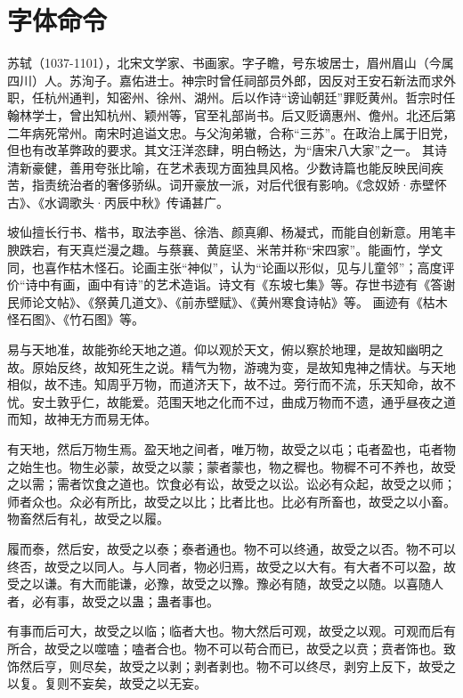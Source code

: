 \section{字体命令}
\label{sec:first}

苏轼（1037-1101），北宋文学家、书画家。字子瞻，号东坡居士，眉州眉山（今属四川）人。苏洵子。嘉佑进士。神宗时曾任祠部员外郎，因反对王安石新法而求外职，任杭州通判，知密州、徐州、湖州。后以作诗“谤讪朝廷”罪贬黄州。哲宗时任翰林学士，曾出知杭州、颖州等，官至礼部尚书。后又贬谪惠州、儋州。北还后第二年病死常州。南宋时追谥文忠。与父洵弟辙，合称“三苏”。在政治上属于旧党，但也有改革弊政的要求。其文汪洋恣肆，明白畅达，为“唐宋八大家”之一。  其诗清新豪健，善用夸张比喻，在艺术表现方面独具风格。少数诗篇也能反映民间疾苦，指责统治者的奢侈骄纵。词开豪放一派，对后代很有影响。《念奴娇·赤壁怀古》、《水调歌头·丙辰中秋》传诵甚广。

{\kai 坡仙擅长行书、楷书，取法李邕、徐浩、颜真卿、杨凝式，而能自创新意。用笔丰腴跌宕，有天真烂漫之趣。与蔡襄、黄庭坚、米芾并称“宋四家”。能画竹，学文同，也喜作枯木怪石。论画主张“神似”，认为“论画以形似，见与儿童邻”；高度评价“诗中有画，画中有诗”的艺术造诣。诗文有《东坡七集》等。存世书迹有《答谢民师论文帖》、《祭黄几道文》、《前赤壁赋》、《黄州寒食诗帖》等。  画迹有《枯木怪石图》、《竹石图》等。}

{\fs 易与天地准，故能弥纶天地之道。仰以观於天文，俯以察於地理，是故知幽明之故。原始反终，故知死生之说。精气为物，游魂为变，是故知鬼神之情状。与天地相似，故不违。知周乎万物，而道济天下，故不过。旁行而不流，乐天知命，故不忧。安土敦乎仁，故能爱。范围天地之化而不过，曲成万物而不遗，通乎昼夜之道而知，故神无方而易无体。}

{\you 有天地，然后万物生焉。盈天地之间者，唯万物，故受之以屯；屯者盈也，屯者物之始生也。物生必蒙，故受之以蒙；蒙者蒙也，物之穉也。物穉不可不养也，故受之以需；需者饮食之道也。饮食必有讼，故受之以讼。讼必有众起，故受之以师；师者众也。众必有所比，故受之以比；比者比也。比必有所畜也，故受之以小畜。物畜然后有礼，故受之以履。}

{\hei 履而泰，然后安，故受之以泰；泰者通也。物不可以终通，故受之以否。物不可以终否，故受之以同人。与人同者，物必归焉，故受之以大有。有大者不可以盈，故受之以谦。有大而能谦，必豫，故受之以豫。豫必有随，故受之以随。以喜随人者，必有事，故受之以蛊；蛊者事也。}

{\li 有事而后可大，故受之以临；临者大也。物大然后可观，故受之以观。可观而后有所合，故受之以噬嗑；嗑者合也。物不可以苟合而已，故受之以贲；贲者饰也。致饰然后亨，则尽矣，故受之以剥；剥者剥也。物不可以终尽，剥穷上反下，故受之以复。复则不妄矣，故受之以无妄。}

